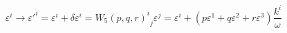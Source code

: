 \begin{equation}
\varepsilon^{i} \rightarrow {\varepsilon'^{i}} = \varepsilon^{i} + \delta \varepsilon^{i} =
{{W_5 (p, q, r)}^{i}}_{j} \varepsilon^{j} = \varepsilon^{i} +
( p\varepsilon^1 + q\varepsilon^2 + r\varepsilon^3)\frac{k^i}{\omega}
\label{95}
\end{equation}


